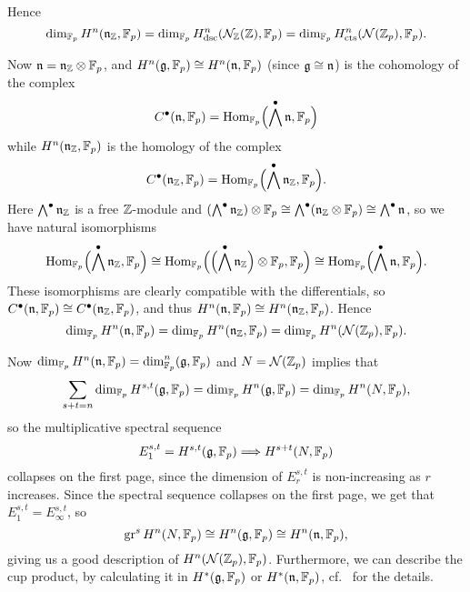 Hence
\begin{equation*}
  \dim_{\mathbb{F}_p} H^{n}(\mathfrak{n}_{\mathbb{Z}},\mathbb{F}_p) = \dim_{\mathbb{F}_p} H_{\mathrm{dsc}}^n(\mathcal{N}_{\mathbb{Z}}(\mathbb{Z}),\mathbb{F}_p)= \dim_{\mathbb{F}_p} H_{\mathrm{cts}}^{n}(\mathcal{N}(\mathbb{Z}_p),\mathbb{F}_p).
\end{equation*}

Now $\mathfrak{n} = \mathfrak{n}_{\mathbb{Z}} \otimes \mathbb{F}_p$, and $H^n(\mathfrak{g},\mathbb{F}_p) \cong H^{n}(\mathfrak{n},\mathbb{F}_p)$ (since $\mathfrak{g} \cong \mathfrak{n}$) is the cohomology of the complex
\begin{equation*}
  C^\bullet(\mathfrak{n},\mathbb{F}_p) = \operatorname{Hom}_{\mathbb{F}_p}\Bigl( \bigwedge^\bullet \mathfrak{n},\mathbb{F}_p \Bigr)
\end{equation*}
while $H^{n}(\mathfrak{n}_{\mathbb{Z}},\mathbb{F}_p)$ is the homology of the complex
\begin{equation*}
  C^\bullet(\mathfrak{n}_{\mathbb{Z}},\mathbb{F}_p) = \operatorname{Hom}_{\mathbb{F}_p}\Bigl( \bigwedge^\bullet \mathfrak{n}_{\mathbb{Z}},\mathbb{F}_p \Bigr).
\end{equation*}
Here $\bigwedge^\bullet \mathfrak{n}_{\mathbb{Z}}$ is a free $\mathbb{Z}$-module and $(\bigwedge^\bullet \mathfrak{n}_{\mathbb{Z}}) \otimes \mathbb{F}_p \cong \bigwedge^\bullet (\mathfrak{n}_{\mathbb{Z}} \otimes \mathbb{F}_p) \cong \bigwedge^\bullet \mathfrak{n}$, so we have natural isomorphisms
\begin{equation*}
  \operatorname{Hom}_{\mathbb{F}_p}\Bigl( \bigwedge^\bullet \mathfrak{n}_{\mathbb{Z}},\mathbb{F}_p \Bigr) \cong \operatorname{Hom}_{\mathbb{F}_p}\Bigl( \Bigl( \bigwedge^\bullet \mathfrak{n}_{\mathbb{Z}} \Bigr) \otimes \mathbb{F}_p, \mathbb{F}_p \Bigr) \cong \operatorname{Hom}_{\mathbb{F}_p}\Bigl( \bigwedge^\bullet \mathfrak{n},\mathbb{F}_p \Bigr).
\end{equation*}
These isomorphisms are clearly compatible with the differentials, so $C^\bullet(\mathfrak{n},\mathbb{F}_p) \cong C^\bullet(\mathfrak{n}_{\mathbb{Z}},\mathbb{F}_p)$, and thus $H^n(\mathfrak{n},\mathbb{F}_p) \cong H^n(\mathfrak{n}_{\mathbb{Z}},\mathbb{F}_p)$. Hence
\begin{equation*}
  \dim_{\mathbb{F}_p} H^n(\mathfrak{n},\mathbb{F}_p) = \dim_{\mathbb{F}_p} H^n(\mathfrak{n}_{\mathbb{Z}},\mathbb{F}_p) = \dim_{\mathbb{F}_p} H^{n}(\mathcal{N}(\mathbb{Z}_p),\mathbb{F}_p).
\end{equation*}

Now $\dim_{\mathbb{F}_{p}} H^{n}(\mathfrak{n},\mathbb{F}_{p}) = \dim_{\mathbb{F}_{p}}^{n}(\mathfrak{g},\mathbb{F}_{p})$ and $N = \mathcal{N}(\mathbb{Z}_{p})$ implies that
\begin{equation*}
  \sum_{s+t = n} \dim_{\mathbb{F}_p} H^{s,t}(\mathfrak{g},\mathbb{F}_p) = \dim_{\mathbb{F}_p} H^n(\mathfrak{g},\mathbb{F}_p) = \dim_{\mathbb{F}_p} H^n(N,\mathbb{F}_p),
\end{equation*}
so the multiplicative spectral sequence
\begin{equation*}
  E_{1}^{s,t} = H^{s,t}(\mathfrak{g},\mathbb{F}_p) \Longrightarrow H^{s+t}(N,\mathbb{F}_p)
\end{equation*}
collapses on the first page, since the dimension of $E_{r}^{s,t}$ is non-increasing as $r$ increases. Since the spectral sequence collapses on the first page, we get that $E_{1}^{s,t} = E_{\infty}^{s,t}$, so
\begin{equation*}
  \operatorname{gr}^{s} H^{n}(N,\mathbb{F}_p) \cong H^n(\mathfrak{g},\mathbb{F}_p) \cong H^n(\mathfrak{n},\mathbb{F}_p),
\end{equation*}
giving us a good description of $H^n(\mathcal{N}(\mathbb{Z}_p),\mathbb{F}_p)$. Furthermore, we can describe the cup product, by calculating it in $H^{*}(\mathfrak{g},\mathbb{F}_{p})$ or $H^{*}(\mathfrak{n},\mathbb{F}_{p})$, cf.\  for the details.


